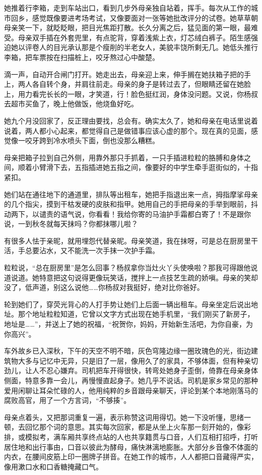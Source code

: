 \documentclass[lang=cn,newtx,12pt,scheme=chinese]{elegantbook}
\begin{document}
她推着行李箱，走到车站出口，看到几步外母亲独自站着，挥手。每次从工作的城市回乡，感觉既像要进考场考试，又像要面对一张等她批改评分的试卷。她草草朝母亲笑一下，就眨眨眼，把目光焦距打散。长久分离之后，猛见面的第一眼，最难受。母亲双手插在外套兜里，有点驼背，穿着浅紫上衣，灯芯绒白裤子。陌生感强迫她以评卷人的目光承认那是个瘦削的半老女人，美貌丰饶所剩无几。她低头推行李箱，把车票按在扫描桩上，咬牙熬过心中酸楚。

滴一声，自动开合闸门打开。她走出去，母亲迎上来，伸手搁在她扶箱子把的手上，两人各自转个身，并肩往前走。母亲的身子是转过去了，但眼睛还留在她脸上，用力看完长长的一眼，才笑道，行！脸色挺红润，身体没问题。又说，你杨叔去超市买鱼了，晚上他做饭，他烧鱼好吃。

她九个月没回家了，反正理由要找，总会有。确实太久了，她和母亲在电话里说着说着，两人都小心起来，都觉得自己是做错事应该心虚的那个。现在真的见面，感觉像一咬牙跨到冷水喷头下面，倒也没那么糟糕。

母亲把箱子拉到自己外侧，用靠外那只手抓着，一只手插进粒粒的胳膊和身体之间，顺着小臂滑下去，五指插进她五指之间，像要好的中学生牵手逛街似的，十指紧扣。

她们站在通往地下的通道里，排队等出租车，她把手指退出来一点，拇指摩挲母亲的几个指尖，摸到干枯发硬的皮肤和指甲。她用自己的手把母亲的手举到眼前，抖动两下，以谴责的语气说，你看看！我给你寄的马油护手霜都白寄了！不是跟你说，一到秋冬就每天抹吗？你都抹哪儿啦？

有很多人怯于亲昵，就用埋怨代替亲昵。母亲笑道，我在抹呀，可是总在厨房里干活，手总要沾水，又不能洗一次手抹一次护手霜。

粒粒说，“总在厨房里”是怎么回事？杨叔拿你当灶火丫头使唤啦？那我可得跟他说道说道。她特意把这句说得更像玩笑话，搅拌上一点技艺生疏的娇嗔。母亲的笑却没了，低声道，别这么说他……你杨叔对我挺好，绝对比你爸好。

轮到她们了，穿荧光背心的人打手势让她们上后面一辆出租车。母亲坐定后说出地址。那个地址粒粒知道，它曾以文字方式出现在她手机里，“我们刚买了新房子，地址是……”，并送上了她的祝福，“祝贺你，妈妈，开始新生活吧，为你自豪，为你高兴”。

车外故乡已入深秋，下午的天空不明不暗，灰色穹隆边缘一圈玫瑰色的光，街边建筑物大多与记忆中无异，只是旧了一层，像用久了的家具，不够体面，但有种亲切劲儿，让人不忍心嫌弃。司机把车开得很快，转弯处她身子歪倒，倚靠在母亲身体侧面，特意多靠一会儿，再慢慢直起身子。她几乎不说话。司机是家乡常见的那种爱用闲聊让耳朵忙碌的人，他用纯粹的乡音跟母亲聊天，评论到某个本地刚落马的腐败高官，用了一个方言词，“不够揍”。

母亲点着头，又把那词重复一遍，表示称赞这词用得切。她一下没听懂，思绪一顿，去回忆那个词的意思。其实每次回家，都是从坐上火车那一刻开始的，像彩排，或模拟考，满车厢共享终点站的人也共享籍贯与口音，人们互相打招呼，打听居住地和出行事由，口音以彼此为酵母，痛快淋漓地膨胀。大部分乡音像不体面的内衣，在腰间皮筋上印一圈牌子拼音。在她工作的城市，人人都把口音藏得严实，像用漱口水和口香糖掩藏口气。
\end{document}
